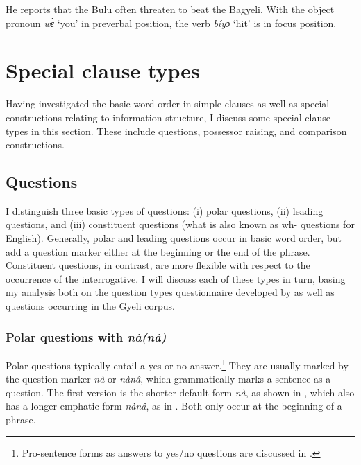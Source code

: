 \noindent He reports that the Bulu often threaten to beat the Bagyeli. With the object pronoun {\itshape wɛ̀} `you' in preverbal position, the verb {\itshape bíyɔ} `hit' is in focus position.








\section{Special clause types}
\label{sec:specialC}

Having investigated the basic word order in simple clauses as well as special constructions relating to information structure, I discuss some special clause types in this section. These include questions, possessor raising, and comparison constructions. 

\subsection{Questions}
\label{sec:Questions}

I distinguish three basic types of questions: (i) polar questions, (ii) leading questions, and (iii) constituent questions (what is also known as wh- questions for English). Generally, polar and leading questions occur in basic word order, but add a question marker either at the beginning or the end of the phrase. Constituent questions, in contrast, are more flexible with respect to the occurrence of the interrogative. I will discuss each of these types in turn,
basing my analysis both on the question types questionnaire developed by \citet{patin2011} as well as questions occurring in the Gyeli corpus.

\subsubsection{Polar questions with {\itshape nà(nâ)}}
\label{sec:PolarQ}

Polar questions typically entail a yes or no answer.\footnote{Pro-sentence forms as answers to yes/no questions are discussed in .}
They are usually marked by the question marker {\itshape nà} or {\itshape nànâ}, which grammatically marks a sentence as a question. The first version is the shorter default form {\itshape nà}, as shown in , which also has a longer emphatic form {\itshape nànâ}, as in . Both only occur at the beginning of a phrase.

